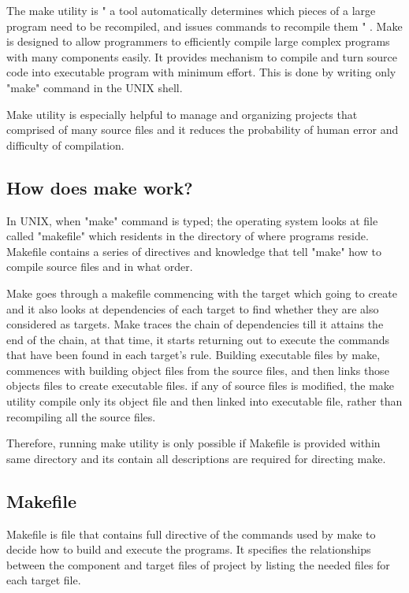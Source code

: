 \documentclass[11pt]{report}
\begin{document}
The make utility is " a tool automatically determines which pieces of a large program need to be recompiled, and issues commands to recompile them " \cite{Stallman:2000:GnuMake}. Make is designed to allow programmers to efficiently compile large complex programs with many components easily. It provides mechanism to compile and turn source code into executable program with minimum effort. This is done by writing only "make" command in the UNIX shell.  

Make utility is especially helpful to manage and organizing projects that comprised of many source files and it reduces the probability of human error and difficulty of compilation.

\subsection{How does make work?}
\label{subsec: how make work}
In UNIX, when "make" command is typed; the operating system looks at file called "makefile" which residents in the directory of where programs reside. Makefile contains a series of directives and knowledge that tell "make" how to compile source files and in what order. 

Make goes through a makefile commencing with the target which going to create and it also looks at dependencies  of each target to find whether they are also considered as targets.  Make traces the chain of dependencies till it attains the end of the chain, at that time, it starts returning out to execute the commands that have been found in each target's rule. Building executable files by make, commences with building object files from the source files, and then links those objects files to create executable files. if any of source files is modified, the make utility compile only its object file and then linked into executable file, rather than recompiling all the source files. 

Therefore, running make utility is only possible if Makefile is provided within same directory and its contain all descriptions are required for directing make.

\subsection{Makefile}
\label{subsec: makefile}
Makefile is file that contains full directive of the commands used by make to decide how to build and execute the programs. It specifies the relationships between the component and target files of project by listing the needed files for each target file.
\end{document}
